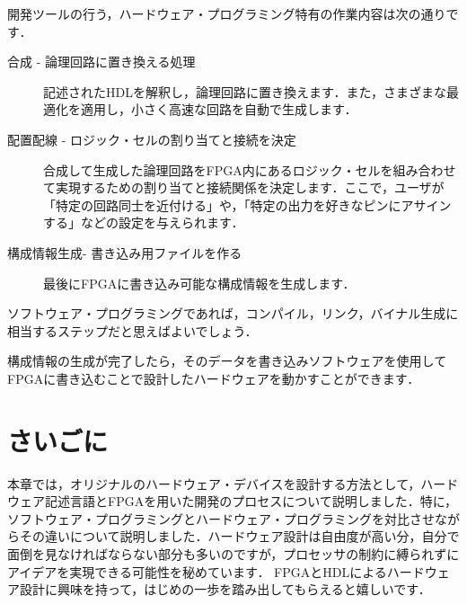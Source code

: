 \documentclass[a4paper,dvipdfmx]{jsarticle}
\begin{document}
開発ツールの行う，ハードウェア・プログラミング特有の作業内容は次の通りです．
\begin{description}
 \item[合成 - 論理回路に置き換える処理] 記述されたHDLを解釈し，論理回路に置き換えます．また，さまざまな最適化を適用し，小さく高速な回路を自動で生成します．
 \item[配置配線 - ロジック・セルの割り当てと接続を決定] 合成して生成した論理回路をFPGA内にあるロジック・セルを組み合わせて実現するための割り当てと接続関係を決定します．ここで，ユーザが「特定の回路同士を近付ける」や，「特定の出力を好きなピンにアサインする」などの設定を与えられます．
 \item[構成情報生成- 書き込み用ファイルを作る] 最後にFPGAに書き込み可能な構成情報を生成します．
\end{description}
ソフトウェア・プログラミングであれば，コンパイル，リンク，バイナル生成に相当するステップだと思えばよいでしょう．

構成情報の生成が完了したら，そのデータを書き込みソフトウェアを使用してFPGAに書き込むことで設計したハードウェアを動かすことができます．

\section{さいごに}
本章では，オリジナルのハードウェア・デバイスを設計する方法として，ハードウェア記述言語とFPGAを用いた開発のプロセスについて説明しました．特に，ソフトウェア・プログラミングとハードウェア・プログラミングを対比させながらその違いについて説明しました．ハードウェア設計は自由度が高い分，自分で面倒を見なければならない部分も多いのですが，プロセッサの制約に縛られずにアイデアを実現できる可能性を秘めています．
FPGAとHDLによるハードウェア設計に興味を持って，はじめの一歩を踏み出してもらえると嬉しいです．
\end{document}
